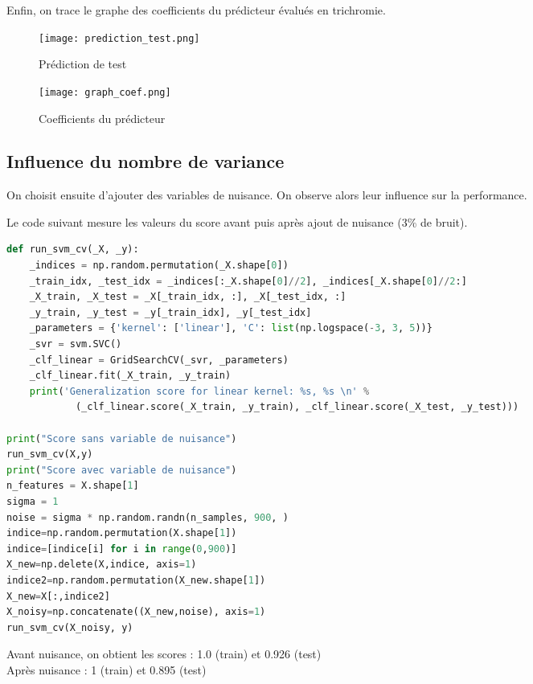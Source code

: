 \documentclass[a4paper, 12pt]{article}
\begin{document}
Enfin, on trace le graphe des coefficients du prédicteur évalués en trichromie.
\begin{figure}[H]

  \begin{minipage}{0.45\linewidth}
   \centering
   \texttt{[image: prediction\_test.png]}
   \caption{Prédiction de test}
  \end{minipage}
    \hfill
  \begin{minipage}{0.45\linewidth}
   \centering
   \texttt{[image: graph\_coef.png]}   
   \caption{Coefficients du prédicteur}
  \end{minipage}
  \label{fig:ma_fig}
\end{figure}


\subsection{Influence du nombre de variance}\label{subsec:influvar}

On choisit ensuite d'ajouter des variables de nuisance. On observe alors leur influence sur la performance. 

Le code suivant mesure les valeurs du score avant puis après ajout de nuisance (3\% de bruit). 

\begin{lstlisting}[language=Python, caption=Calcul des scores avant et après nuisance]
def run_svm_cv(_X, _y):
    _indices = np.random.permutation(_X.shape[0])
    _train_idx, _test_idx = _indices[:_X.shape[0]//2], _indices[_X.shape[0]//2:]
    _X_train, _X_test = _X[_train_idx, :], _X[_test_idx, :]
    _y_train, _y_test = _y[_train_idx], _y[_test_idx]
    _parameters = {'kernel': ['linear'], 'C': list(np.logspace(-3, 3, 5))}
    _svr = svm.SVC()
    _clf_linear = GridSearchCV(_svr, _parameters)
    _clf_linear.fit(_X_train, _y_train)
    print('Generalization score for linear kernel: %s, %s \n' %
            (_clf_linear.score(_X_train, _y_train), _clf_linear.score(_X_test, _y_test)))
            
print("Score sans variable de nuisance")
run_svm_cv(X,y)
print("Score avec variable de nuisance")
n_features = X.shape[1]
sigma = 1
noise = sigma * np.random.randn(n_samples, 900, )
indice=np.random.permutation(X.shape[1])
indice=[indice[i] for i in range(0,900)]
X_new=np.delete(X,indice, axis=1)
indice2=np.random.permutation(X_new.shape[1])
X_new=X[:,indice2]
X_noisy=np.concatenate((X_new,noise), axis=1)
run_svm_cv(X_noisy, y)
\end{lstlisting}
Avant nuisance, on obtient les scores : 1.0 (train) et 0.926 (test)\\
Après nuisance : 1 (train) et 0.895 (test)
\end{document}
